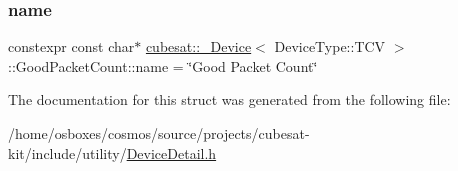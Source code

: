 \subsubsection{\texorpdfstring{name}{name}}
{\footnotesize\ttfamily constexpr const char$\ast$ \hyperlink{structcubesat_1_1__Device}{cubesat\+::\+\_\+\+Device}$<$ Device\+Type\+::\+T\+CV $>$\+::Good\+Packet\+Count\+::name = \char`\"{}Good Packet Count\char`\"{}\hspace{0.3cm}{\ttfamily [static]}}



The documentation for this struct was generated from the following file\+:\begin{DoxyCompactItemize}
\item 
/home/osboxes/cosmos/source/projects/cubesat-\/kit/include/utility/\hyperlink{DeviceDetail_8h}{Device\+Detail.\+h}\end{DoxyCompactItemize}
